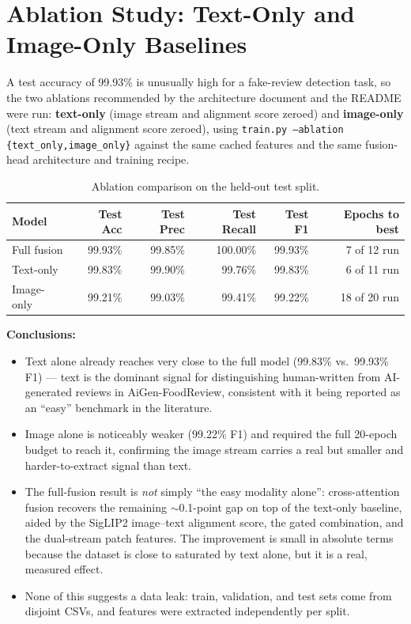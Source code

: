 \documentclass[11pt]{article}
\begin{document}
\section{Ablation Study: Text-Only and Image-Only Baselines}

A test accuracy of 99.93\% is unusually high for a fake-review detection task, so the two ablations recommended by the architecture document and the README were run: \textbf{text-only} (image stream and alignment score zeroed) and \textbf{image-only} (text stream and alignment score zeroed), using \texttt{train.py --ablation \{text\_only,image\_only\}} against the same cached features and the same fusion-head architecture and training recipe.

\begin{table}[h]
\centering
\begin{tabular}{lrrrrr}
\toprule
\textbf{Model} & \textbf{Test Acc} & \textbf{Test Prec} & \textbf{Test Recall} & \textbf{Test F1} & \textbf{Epochs to best} \\
\midrule
Full fusion  & 99.93\% & 99.85\% & 100.00\% & 99.93\% & 7 of 12 run \\
Text-only    & 99.83\% & 99.90\% &  99.76\% & 99.83\% & 6 of 11 run \\
Image-only   & 99.21\% & 99.03\% &  99.41\% & 99.22\% & 18 of 20 run \\
\bottomrule
\end{tabular}
\caption{Ablation comparison on the held-out test split.}
\end{table}

\textbf{Conclusions:}
\begin{itemize}[nosep]
    \item Text alone already reaches very close to the full model (99.83\% vs.\ 99.93\% F1) --- text is the dominant signal for distinguishing human-written from AI-generated reviews in AiGen-FoodReview, consistent with it being reported as an ``easy'' benchmark in the literature.
    \item Image alone is noticeably weaker (99.22\% F1) and required the full 20-epoch budget to reach it, confirming the image stream carries a real but smaller and harder-to-extract signal than text.
    \item The full-fusion result is \emph{not} simply ``the easy modality alone'': cross-attention fusion recovers the remaining $\sim$0.1-point gap on top of the text-only baseline, aided by the SigLIP2 image--text alignment score, the gated combination, and the dual-stream patch features. The improvement is small in absolute terms because the dataset is close to saturated by text alone, but it is a real, measured effect.
    \item None of this suggests a data leak: train, validation, and test sets come from disjoint CSVs, and features were extracted independently per split.
\end{itemize}
\end{document}
